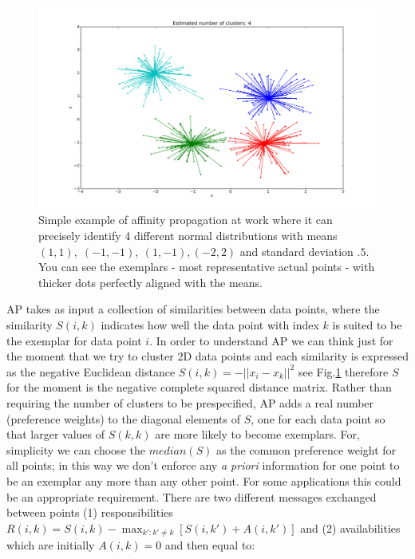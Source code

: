 \documentclass[preprint,authoryear,a4paper,10pt,onecolumn]{elsarticle}
\begin{document}
%
\begin{figure}
\noindent \begin{centering}
\includegraphics[scale=0.4]{last_figures/affinity_propagation_ok2}
\par\end{centering}

\label{Fig:AP_2d}

\caption{Simple example of affinity propagation at work where it can
  precisely identify 4 different normal distributions with means
  $(1,1),\;(-1,-1),\:(1,-1),$$(-2,2)$ and standard deviation $.5$. You
  can see the exemplars - most representative actual points - with
  thicker dots perfectly aligned with the means.}

\end{figure}

AP takes as input a collection of similarities between data points,
where the similarity $S(i,k)$ indicates how well the data point with
index $k$ is suited to be the exemplar for data point $i$. In order to
understand AP we can think just for the moment that we try to cluster 2D
data points and each similarity is expressed as the negative Euclidean
distance $S(i,k)=-||x_{i}-x_{k}||^{2}$ see Fig.\ref{Fig:AP_2d} therefore
$S$ for the moment is the negative complete squared distance matrix.
Rather than requiring the number of clusters to be prespecified, AP adds
a real number (preference weights) to the diagonal elements of $S$, one
for each data point so that larger values of $S(k,k)$ are more likely to
become exemplars. For, simplicity we can choose the $median(S)$ as the
common preference weight for all points; in this way we don't enforce
any \emph{a priori} information for one point to be an exemplar any more
than any other point. For some applications this could be an appropriate
requirement. There are two different messages exchanged between points
(1) responsibilities $R(i,k)=S(i,k)-{\displaystyle \max_{k':k'\neq
    k}}[S(i,k')+A(i,k')]$ and (2) availabilities which are initially
$A(i,k)=0$ and then equal to:
\end{document}
